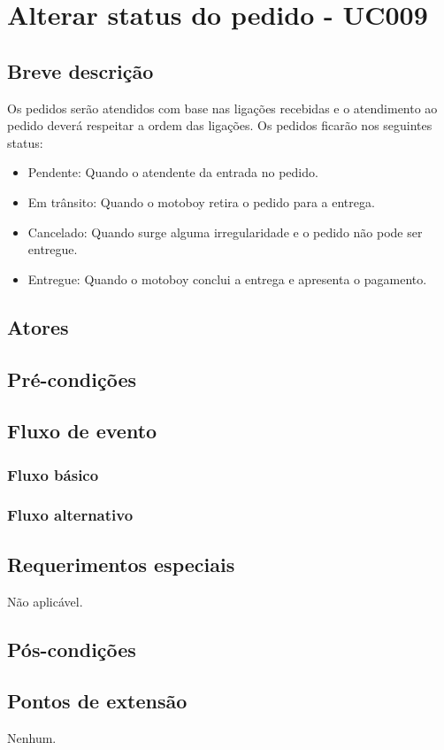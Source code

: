\chapter{Alterar status do pedido - UC009} \label{uc009}

\section{Breve descrição}

Os pedidos serão atendidos com base nas ligações recebidas e o atendimento ao pedido deverá respeitar a ordem das ligações. Os pedidos ficarão nos seguintes status:

\begin{itemize}
	\item Pendente: Quando o atendente da entrada no pedido.
	\item Em trânsito: Quando o motoboy retira o pedido para a entrega.
	\item Cancelado: Quando surge alguma irregularidade e o pedido não pode ser entregue.
	\item Entregue: Quando o motoboy conclui a entrega e apresenta o pagamento.
\end{itemize}

\section{Atores}

\section{Pré-condições}

\section{Fluxo de evento}

\subsection{Fluxo básico}

\subsection{Fluxo alternativo}

\section{Requerimentos especiais}

Não aplicável.

\section{Pós-condições}

\section{Pontos de extensão}

Nenhum.